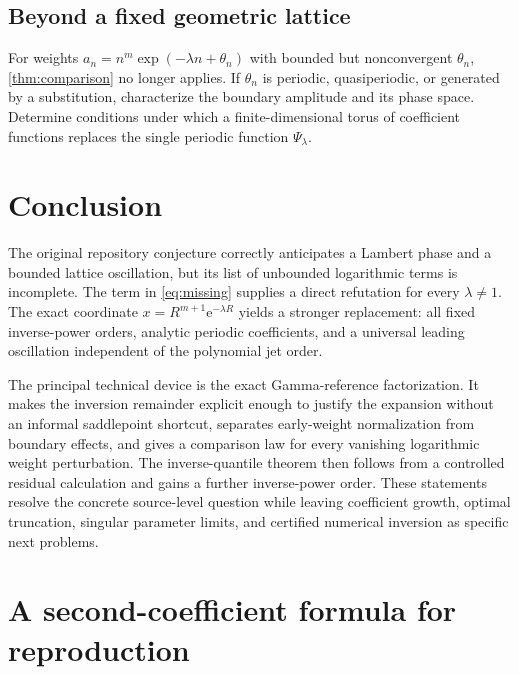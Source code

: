 \documentclass[11pt,a4paper]{article}
\numberwithin{equation}{section}
\theoremstyle{definition}
\newcommand{\ee}{\mathrm e}
\begin{document}
\subsection{Beyond a fixed geometric lattice}
For weights $a_n=n^m\exp(-\lambda n+\theta_n)$ with bounded but nonconvergent $\theta_n$, \cref{thm:comparison} no longer applies. If $\theta_n$ is periodic, quasiperiodic, or generated by a substitution, characterize the boundary amplitude and its phase space. Determine conditions under which a finite-dimensional torus of coefficient functions replaces the single periodic function $\Psi_\lambda$.

\section{Conclusion}
The original repository conjecture correctly anticipates a Lambert phase and a bounded lattice oscillation, but its list of unbounded logarithmic terms is incomplete. The term in \eqref{eq:missing} supplies a direct refutation for every $\lambda\ne1$. The exact coordinate $x=R^{m+1}\ee^{-\lambda R}$ yields a stronger replacement: all fixed inverse-power orders, analytic periodic coefficients, and a universal leading oscillation independent of the polynomial jet order.

The principal technical device is the exact Gamma-reference factorization. It makes the inversion remainder explicit enough to justify the expansion without an informal saddlepoint shortcut, separates early-weight normalization from boundary effects, and gives a comparison law for every vanishing logarithmic weight perturbation. The inverse-quantile theorem then follows from a controlled residual calculation and gains a further inverse-power order. These statements resolve the concrete source-level question while leaving coefficient growth, optimal truncation, singular parameter limits, and certified numerical inversion as specific next problems.

\appendix
\section{A second-coefficient formula for reproduction}
\label{app:A2}
\end{document}
